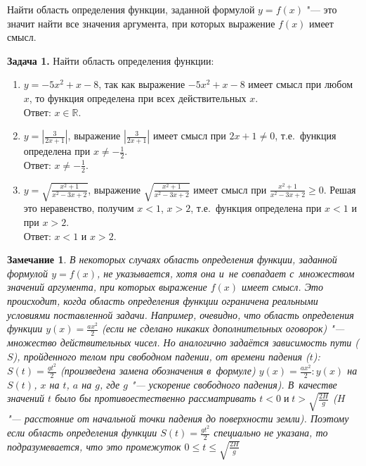 Найти область определения функции, заданной формулой $y=f(x)$ "---
это значит найти все значения аргумента, при которых выражение $f(x)$
имеет смысл.

\textbf{Задача 1.} Найти область определения функции:
\begin{enumerate}
\item $y = -5x^{2}+x-8$, так как выражение $-5x^{2}+x-8$ имеет смысл
при любом $x$, то функция определена при всех действительных $x$.\\
Ответ: $x \in \mathbb{R}$.

\item $\displaystyle y = \left|\frac{3}{2x+1}\right|$,
выражение $\displaystyle\left|\frac{3}{2x+1}\right|$
имеет смысл при $2x+1 \ne 0$,
т.е.\ функция определена при $\displaystyle x \ne -\frac{1}{2}$.\\
Ответ: $\displaystyle x \ne -\frac{1}{2}$.

\item $\displaystyle y = \sqrt{\frac{x^{2}+1}{x^{2}-3x+2}}$,
выражение
$\displaystyle\sqrt{\frac{x^{2}+1}{x^{2}-3x+2}}$
имеет смысл при
$\displaystyle\frac{x^{2}+1}{x^{2}-3x+2} \geqslant 0$.
Решая это неравенство, получим $x<1$, $x>2$,
т.е.\ функция определена при $x<1$ и при $x>2$.\\
Ответ: $x<1$ и $x>2$.
\end{enumerate}

\newtheorem{Note}{Замечание}
\begin{Note}
В некоторых случаях область определения функции, заданной формулой
$y = f(x)$, не указывается, хотя она и~не совпадает с~множеством значений
аргумента, при которых выражение $f(x)$ имеет смысл. Это происходит, когда
область определения функции ограничена реальными условиями поставленной
задачи. Например, очевидно, что область определения функции
$\displaystyle y(x) = \frac{ax^{2}}{2}$
(если не сделано никаких дополнительных оговорок)
"--- множество действительных чисел. Но аналогично задаётся зависимость
пути ($S$), пройденного телом при свободном падении, от времени падения
($t$):
$\displaystyle S(t) = \frac{gt^{2}}{2}$
(произведена замена обозначения в~формуле)
$\displaystyle y(x) = \frac{ax^{2}}{2}: y(x)$
на $S(t)$, $x$ на $t$, $a$ на $g$,
где $g$ "--- ускорение свободного падения).
В~качестве значений $t$ было бы противоестественно рассматривать
$t<0 \; \text{и} \; \displaystyle t>\sqrt{\frac{2H}{g}}$
($H$ "--- расстояние от начальной точки падения до поверхности земли).
Поэтому если область определения функции
$\displaystyle S(t) = \frac{gt^{2}}{2}$
специально не указана, то подразумевается, что это промежуток
$\displaystyle 0 \leqslant t \leqslant \sqrt{\frac{2H}{g}}$
\end{Note}

